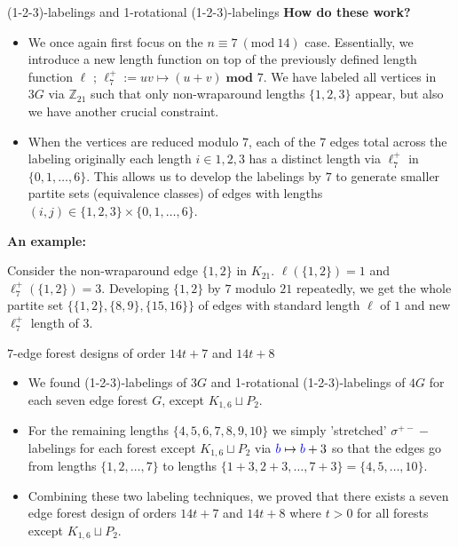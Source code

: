 \documentclass[xcolor=x11names,compress,8pt]{beamer}
\theoremstyle{plain}
\newcommand{\ZZ}{\ensuremath{\mathbb{Z}}}
\newcommand{\Mod}[1]{\ (\mathrm{mod}\ #1)}
\begin{document}
\begin{frame}{(1-2-3)-labelings and 1-rotational (1-2-3)-labelings}
    \textbf{How do these work?}\newline
    \begin{itemize}
        \item We once again first focus on the $n\equiv 7\Mod{14}$ case. Essentially, we introduce a new length function on top of the previously defined length function $\ell$ ; $\ell_{7}^{+}:= uv\mapsto (u+v) \; \textbf{mod } 7$. We have labeled all vertices in $3G$ via $\ZZ_{21}$ such that only non-wraparound lengths $\{1,2,3\}$ appear, but also we have another crucial constraint.
        
        \pause

        \item When the vertices are reduced modulo $7$, each of the $7$ edges total across the labeling originally each length $i\in {1,2,3}$ has a distinct length via $\ell_{7}^{+}$ in $\{0,1,\hdots, 6\}$. This allows us to develop the labelings by $7$ to generate smaller partite sets (equivalence classes) of edges with lengths $(i,j)\in \{1,2,3\}\times \{0,1,\hdots,6\}$.
        
    \end{itemize}
    \pause
    \textbf{An example:}

        Consider the non-wraparound edge $\{1,2\}$ in $K_{21}$. $\ell(\{1,2\})=1$ and $\ell_{7}^{+}(\{1,2\})=3$. Developing $\{1,2\}$ by $7$ modulo $21$ repeatedly, we get the whole partite set $\{\{1,2\},\{8,9\},\{15,16\}\}$ of edges with standard length $\ell$ of $1$ and new $\ell_{7}^{+}$ length of $3$.

\end{frame}

\begin{frame}{$7$-edge forest designs of order $14t+7$ and $14t+8$}
    \begin{itemize}
    \item We found (1-2-3)-labelings of $3G$ and 1-rotational (1-2-3)-labelings of $4G$ for each seven edge forest $G$, except $K_{1,6}\sqcup P_{2}$.
    \pause
    \item For the remaining lengths $\{4,5,6,7,8,9,10\}$ we simply 'stretched' $\sigma^{+-}-$labelings for each forest except $K_{1,6}\sqcup P_{2}$ via $\textcolor{blue}{b}\mapsto \textcolor{blue}{b}+3$ so that the edges go from lengths $\{1,2,\hdots, 7\}$ to lengths $\{1+3,2+3,\hdots,7+3\}=\{4,5,\hdots,10\}$.
    \item Combining these two labeling techniques, we proved that there exists a seven edge forest design of orders $14t+7$ and $14t+8$ where $t>0$ for all forests except $K_{1,6}\sqcup P_{2}$.
    \end{itemize}

\end{frame}
\end{document}
